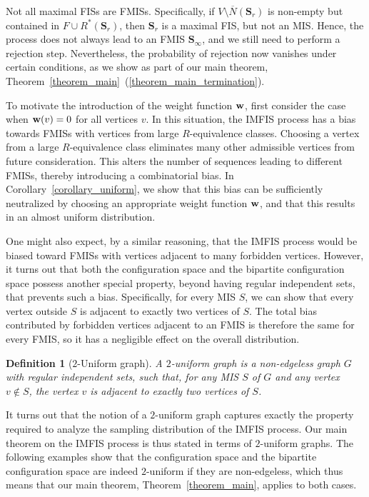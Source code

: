 \documentclass{article}
\theoremstyle{plain}
\theoremstyle{remark}
\theoremstyle{plain}
\newtheorem{definition}[theorem]{Definition}
\numberwithin{equation}{section}
\renewcommand{\b}{{\bf{w}}}
\begin{document}
	Not all maximal FISs are FMISs. Specifically, if $V\setminus\overline{N}(\boldsymbol{S}_r)$ is non-empty but contained in $F\cup R^*(\boldsymbol{S}_r)$, then $\boldsymbol{S}_r$ is a maximal FIS, but not an MIS. Hence, the process does not always lead to an FMIS $\boldsymbol{S}_{\infty}$, and we still need to perform a rejection step. Nevertheless, the probability of rejection now vanishes under certain conditions, as we show as part of our main theorem, Theorem~\ref{theorem_main}~(\ref{theorem_main_termination}).
	
	To motivate the introduction of the weight function $\b$, first consider the case when $\b(v)=0$ for all vertices $v$. In this situation, the IMFIS process has a bias towards FMISs with vertices from large $R$-equivalence classes. Choosing a vertex from a large $R$-equivalence class eliminates many other admissible vertices from future consideration. This alters the number of sequences leading to different FMISs, thereby introducing a combinatorial bias. In Corollary~\ref{corollary_uniform}, we show that this bias can be sufficiently neutralized by choosing an appropriate weight function $\b$, and that this results in an almost uniform distribution.
	
	One might also expect, by a similar reasoning, that the IMFIS process would be biased toward FMISs with vertices adjacent to many forbidden vertices. However, it turns out that both the configuration space and the bipartite configuration space possess another special property, beyond having regular independent sets, that prevents such a bias. Specifically, for every MIS $S$, we can show that every vertex outside $S$ is adjacent to exactly two vertices of $S$. The total bias contributed by forbidden vertices adjacent to an FMIS is therefore the same for every FMIS, so it has a negligible effect on the overall distribution.
	
	\begin{definition}[$2$-Uniform graph]\label{definition_uniform}
		A \emph{$2$-uniform graph} is a non-edgeless graph $G$ with regular independent sets, such that, for any MIS $S$ of $G$ and any vertex $v\notin S$, the vertex $v$ is adjacent to exactly two vertices of $S$.
	\end{definition}
	
	It turns out that the notion of a $2$-uniform graph captures exactly the property required to analyze the sampling distribution of the IMFIS process. Our main theorem on the IMFIS process is thus stated in terms of $2$-uniform graphs. The following examples show that the configuration space and the bipartite configuration space are indeed $2$-uniform if they are non-edgeless, which thus means that our main theorem, Theorem~\ref{theorem_main}, applies to both cases.
	
\end{document}
